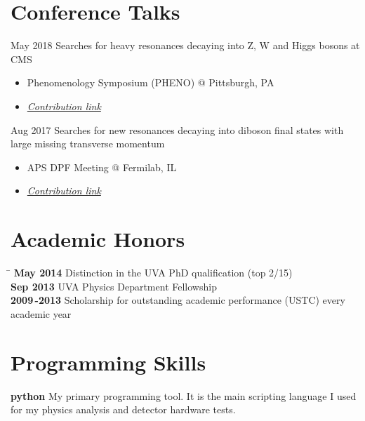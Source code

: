 \documentclass[10pt]{article} %
\begin{document}
\section{Conference Talks}
\job
{May 2018}{}
{Searches for heavy resonances decaying into Z, W and Higgs bosons at CMS}
{\begin{itemize}
\item Phenomenology Symposium (PHENO) @ Pittsburgh, PA
\item \href{https://indico.cern.ch/event/699148/contributions/2986197/}{\textit{Contribution link}}
\end{itemize}
}
\job
{Aug 2017}{}
{Searches for new resonances decaying into diboson final states with large missing transverse momentum}
{\begin{itemize}
\item APS DPF Meeting @ Fermilab, IL
\item \href{https://indico.fnal.gov/event/11999/session/10/contribution/56}{\textit{Contribution link}}
\end{itemize}
}

\section{Academic Honors}
\begin{tabbing} %
\hspace{2cm} \= \kill
\textbf{May 2014} \> Distinction in the UVA PhD qualification (top 2/15) \\
\textbf{Sep 2013} \> UVA Physics Department Fellowship \\
\textbf{2009\,-2013} \> Scholarship for outstanding academic performance (USTC) every academic year\\
\end{tabbing}

\section{Programming Skills}
\textbf{python}
\small{
My primary programming tool. It is the main scripting language I used for my physics analysis and detector hardware tests.
}\\
\end{document}
